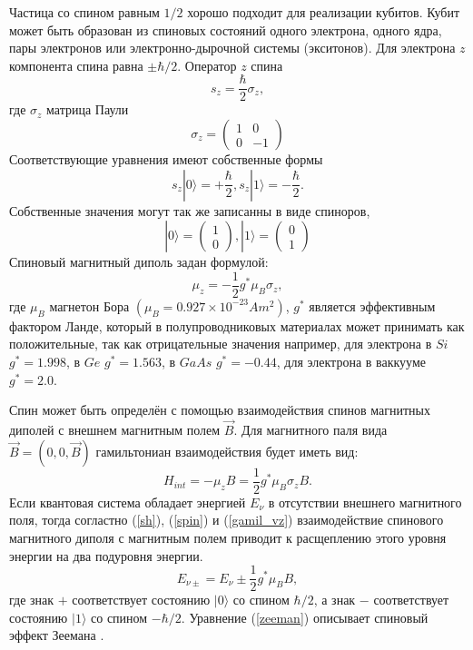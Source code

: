 \documentclass[14pt,a4paper]{PhDthesis}
\begin{document}
Частица со спином равным $1/2$ хорошо подходит для реализации кубитов. Кубит может быть образован из спиновых состояний
одного электрона, одного ядра, пары электронов или электронно-дырочной системы (экситонов). Для электрона $z$ компонента спина равна $\pm \hbar/2$. Оператор $z$ спина 
\begin{equation}
s_{z} = \frac{\hbar}{2}\sigma_{z} \label{sh},
\end{equation}
где $\sigma_{z}$ матрица Паули
\begin{equation}
\sigma_{z} = \begin{pmatrix} 1 & 0 \\
 							 0 & -1
 			 \end{pmatrix}
\end{equation}
Соответствующие уравнения имеют собственные формы
\begin{equation}
s_{z}|0\rangle = +\frac{\hbar}{2},   s_{z}|1\rangle = -\frac{\hbar}{2} \label{spin}.
\end{equation}
Собственные значения могут так же записанны в виде спиноров,
\begin{equation}
|0\rangle = \begin{pmatrix} 1 \\
 						    0
 			 \end{pmatrix},        |1\rangle = \begin{pmatrix} 0 \\
 			    			                                   1
 			                                   \end{pmatrix}
\end{equation}
Спиновый магнитный диполь задан формулой:
\begin{equation}
\mu_{z} = -\frac{1}{2}g^{*}\mu_{B}\sigma_{z},
\end{equation}
где $\mu_{B}$ магнетон Бора $(\mu_{B} = 0.927 \times 10^{-23} Am^{2})$, $g^{*}$ является эффективным фактором Ланде, который в полупроводниковых материалах может принимать как положительные, так как отрицательные значения
например, для электрона в $Si$ $g^{*} = 1.998$, в $Ge$ $g^{*} = 1.563$, в $GaAs$ $g^{*} = -0.44$, для электрона в ваккууме $g^{*} = 2.0$.

Спин может быть определён с помощью взаимодействия спинов магнитных диполей с внешнем магнитным полем $\vec{B}$. Для магнитного паля вида $\vec{B} = (0, 0, \vec{B})$ гамильтониан взаимодействия будет иметь вид:
\begin{equation}
H_{int} = -\mu_{z}B = \frac{1}{2}g^{*}\mu_{B}\sigma_{z}B \label{gamil_vz}.
\end{equation}
Если квантовая система обладает энергией $E_{\nu}$ в отсутствии внешнего магнитного поля, тогда согластно (\ref{sh}),  (\ref{spin}) и (\ref{gamil_vz}) взаимодействие спинового магнитного диполя с магнитным полем приводит к расщеплению этого уровня энергии на два подуровня энергии.
\begin{equation}
E_{\nu\pm} = E_{\nu} \pm \frac{1}{2}g^{*}\mu_{B}B \label{zeeman},
\end{equation}
где знак $+$ соответствует состоянию $|0\rangle$ со спином $\hbar/2$, а знак $-$ соответствует состоянию $|1\rangle$ со спином 
$-\hbar/2$. Уравнение (\ref{zeeman}) описывает спиновый эффект Зеемана \cite{Janusz:2005}. 
\end{document}

